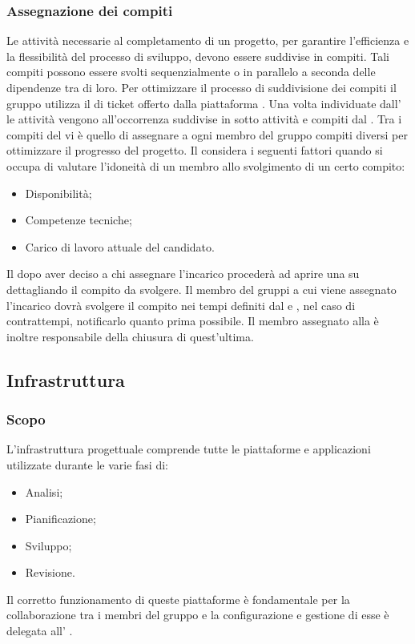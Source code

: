 \subsubsection{Assegnazione dei compiti}
Le attività necessarie al completamento di un progetto, per garantire l'efficienza e la flessibilità del processo di sviluppo, devono essere suddivise in compiti. Tali compiti possono essere svolti sequenzialmente o in parallelo a seconda delle dipendenze tra di loro. Per ottimizzare il processo di suddivisione dei compiti il gruppo utilizza il  di ticket offerto dalla piattaforma .
Una volta individuate dall'\ana{} le attività vengono all'occorrenza suddivise in sotto attività e compiti dal \RdP{}. Tra i compiti del \RdP{} vi è quello di assegnare a ogni membro del gruppo compiti diversi per ottimizzare il progresso del progetto. Il \RdP{} considera i seguenti fattori quando si occupa di valutare l'idoneità di un membro allo svolgimento di un certo compito:
\begin{itemize}
\item Disponibilità;
\item Competenze tecniche;
\item Carico di lavoro attuale del candidato.
\end{itemize}
Il \RdP{} dopo aver deciso a chi assegnare l'incarico procederà ad aprire una  su  dettagliando il compito da svolgere.
Il membro del gruppi a cui viene assegnato l'incarico dovrà svolgere il compito nei tempi definiti dal \RdP{} e , nel caso di contrattempi, notificarlo quanto prima possibile. Il membro assegnato alla  è inoltre responsabile della chiusura di quest'ultima.

\subsection{Infrastruttura}
\subsubsection{Scopo}
L'infrastruttura progettuale comprende tutte le piattaforme e applicazioni utilizzate durante le varie fasi di:
\begin{itemize}
\item Analisi;
\item Pianificazione;
\item Sviluppo;
\item Revisione.
\end{itemize}
Il corretto funzionamento di queste piattaforme è fondamentale per la collaborazione tra i membri del gruppo e la configurazione e gestione di esse è delegata all' \adm{}.

